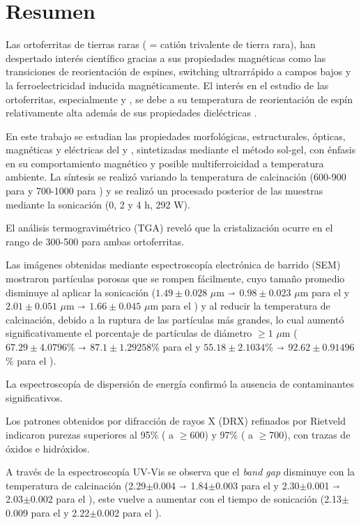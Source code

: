 \documentclass[../main.tex]{subfiles}
\begin{document}
\chapter{Resumen}
Las ortoferritas de tierras raras  ( = catión trivalente de tierra rara), han despertado interés científico gracias a sus propiedades magnéticas como las transiciones de reorientación de espines, switching ultrarrápido a campos bajos y la ferroelectricidad inducida magnéticamente. El interés en el estudio de las ortoferritas, especialmente \neod{} y \sama{}, se debe a su temperatura de reorientación de espín relativamente alta además de sus propiedades dieléctricas \cite{Nakhaei2019} \cite{Sasmal2020}.

En este trabajo se estudian las propiedades morfológicas, estructurales, ópticas, magnéticas y eléctricas del \neod{} y \sama{}, sintetizadas mediante el método sol-gel, con énfasis en su comportamiento magnético y posible multiferroicidad a temperatura ambiente. La síntesis se realizó variando la temperatura de calcinación (600-900\gradoC{} para \neod{} y 700-1000\gradoC{} para \sama) y se realizó un procesado posterior de las muestras mediante la sonicación (0, 2 y 4 h, 292 W).

El análisis termogravimétrico (TGA) reveló que la cristalización ocurre en el rango de 300-500\gradoC{} para ambas ortoferritas.

Las imágenes obtenidas mediante espectroscopía electrónica de barrido (SEM) mostraron partículas porosas que se rompen fácilmente, cuyo tamaño promedio disminuye al aplicar la sonicación ($1.49\pm0.028$ $\mu$m $\shortrightarrow$ $0.98\pm0.023$ $\mu$m para el \neod{} y $2.01\pm0.051$ $\mu$m $\shortrightarrow$ $1.66\pm0.045$ $\mu$m para el \sama{}) y al reducir la temperatura de calcinación, debido a la ruptura de las partículas más grandes, lo cual aumentó significativamente el porcentaje de partículas de diámetro $\geq1$ $\mu$m ($67.29\pm4.0796$\% $\shortrightarrow$ $87.1\pm1.29258$\% para el \neod{} y $55.18\pm2.1034$\% $\shortrightarrow$ $92.62\pm0.91496$\% para el \sama{}).

La espectroscopía de dispersión de energía confirmó la ausencia de contaminantes significativos.

Los patrones obtenidos por difracción de rayos X (DRX) refinados por Rietveld indicaron purezas superiores al 95\% (\neod{} a $\geq$600\gradoC) y 97\% (\sama{} a $\geq$700\gradoC), con trazas de óxidos e hidróxidos.

A través de la espectroscopía UV-Vis se observa que el \textit{band gap} disminuye con la temperatura de calcinación (2.29$\pm$0.004 $\shortrightarrow$ 1.84$\pm$0.003 para el \neod{} y 2.30$\pm$0.001 $\shortrightarrow$ 2.03$\pm$0.002 para el \sama{}), este vuelve a aumentar con el tiempo de sonicación (2.13$\pm$0.009 para el \neod{} y 2.22$\pm$0.002 para el \sama{}).
\end{document}
